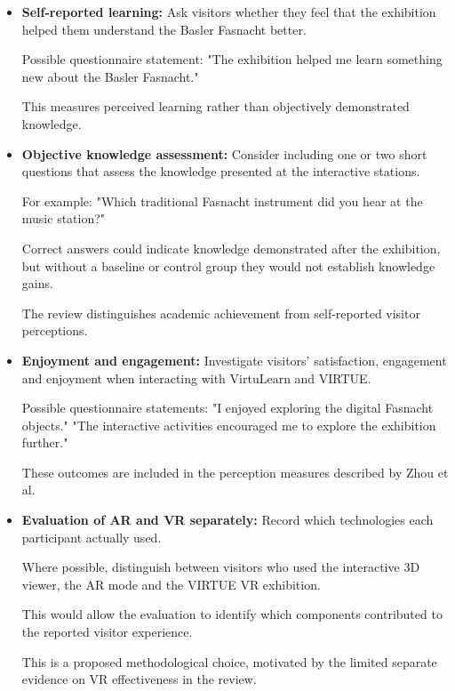 \begin{itemize}
    \item \textbf{Self-reported learning:}
    Ask visitors whether they feel that the
    exhibition helped them understand the
    Basler Fasnacht better.

    Possible questionnaire statement:
    "The exhibition helped me learn something
    new about the Basler Fasnacht."

    This measures perceived learning rather
    than objectively demonstrated knowledge.
    \cite[p.~5]{zhou_meta-analytic_2022}

    \item \textbf{Objective knowledge assessment:}
    Consider including one or two short questions
    that assess the knowledge presented at
    the interactive stations.

    For example:
    "Which traditional Fasnacht instrument
    did you hear at the music station?"

    Correct answers could indicate knowledge
    demonstrated after the exhibition,
    but without a baseline or control group
    they would not establish knowledge gains.

    The review distinguishes academic achievement
    from self-reported visitor perceptions.
    \cite[pp.~5,~11--13]{zhou_meta-analytic_2022}

    \item \textbf{Enjoyment and engagement:}
    Investigate visitors' satisfaction,
    engagement and enjoyment when interacting
    with VirtuLearn and VIRTUE.

    Possible questionnaire statements:
    "I enjoyed exploring the digital Fasnacht objects."
    "The interactive activities encouraged me
    to explore the exhibition further."

    These outcomes are included in the
    perception measures described by Zhou et al.
    \cite[pp.~5,~11--12]{zhou_meta-analytic_2022}

    \item \textbf{Evaluation of AR and VR separately:}
    Record which technologies each participant
    actually used.

    Where possible, distinguish between
    visitors who used the interactive 3D viewer,
    the AR mode and the VIRTUE VR exhibition.

    This would allow the evaluation to identify
    which components contributed to the
    reported visitor experience.

    This is a proposed methodological choice,
    motivated by the limited separate evidence
    on VR effectiveness in the review.
    \cite[pp.~10--11]{zhou_meta-analytic_2022}


\end{itemize}

